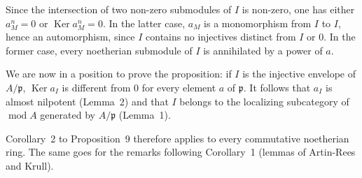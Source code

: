 Since the intersection of two non-zero submodules of $I$ is non-zero,
one has either $a_M^n = 0$ or $\operatorname{Ker} a_M^n = 0$. In the
latter case, $a_M$ is a monomorphism from $I$ to $I$, hence an
automorphism, since $I$ contains no injectives distinct from $I$ or $0$.
In the former case, every noetherian submodule of $I$ is annihilated by
a power of $a$.

We are now in a position to prove the proposition: if $I$ is the
injective envelope of $A/\mathfrak{p}$, $\operatorname{Ker} a_I$ is
different from $0$ for every element $a$ of $\mathfrak{p}$. It follows
that $a_I$ is almost nilpotent (Lemma~2) and that $I$ belongs to the
localizing subcategory of $\operatorname{mod} A$ generated by
$A/\mathfrak{p}$ (Lemma~1).

Corollary~2 to Proposition~9 therefore applies to every commutative
noetherian ring. The same goes for the remarks following Corollary~1
(lemmas of Artin-Rees and Krull).
